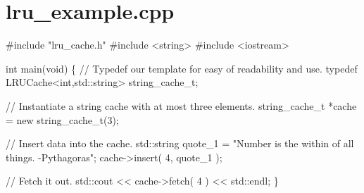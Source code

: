 \section{lru\_\-example.cpp}

\begin{DoxyCodeInclude}
\textcolor{preprocessor}{#include "lru_cache.h"}
\textcolor{preprocessor}{#include <string>}
\textcolor{preprocessor}{#include <iostream>}

\textcolor{keywordtype}{int} main(\textcolor{keywordtype}{void}) \{
        \textcolor{comment}{// Typedef our template for easy of readability and use.}
        \textcolor{keyword}{typedef} LRUCache<int,std::string> string\_cache\_t;
        
        \textcolor{comment}{// Instantiate a string cache with at most three elements.}
        string\_cache\_t *cache = \textcolor{keyword}{new} string\_cache\_t(3);
        
        \textcolor{comment}{// Insert data into the cache.}
        std::string quote\_1 = \textcolor{stringliteral}{"Number is the within of all things. -Pythagoras"};
        cache->insert( 4, quote\_1 );

        \textcolor{comment}{// Fetch it out.}
        std::cout << cache->fetch( 4 ) << std::endl;    
\}
\end{DoxyCodeInclude}
 